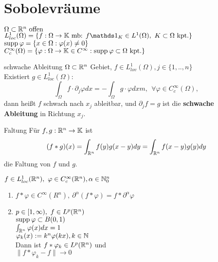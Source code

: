 \section{Sobolevräume}

\(\Omega \subset \mathbb{R}^n \text{ offen}\)\\
\(L_{loc}^1(\Omega) = \{f:\Omega \to \KK \text{ mb: }
f\indicator_K \in L^1(\Omega),\ K\subset \Omega \text{ kpt.}\}\) \\
\(\text{supp\hspace{0.2em}}\varphi = \{x\in \Omega: \varphi(x) \neq 0\}\)\\
\(C_c^\infty(\Omega)=\{\varphi:\Omega \to \mathbb{K} \in C^\infty: 
\text{supp\hspace{0.2em}}\varphi\subset\Omega \text{ kpt.}\}\)\\

\begin{definition}{schwache Ableitung}
    \(\Omega \subset \mathbb{R}^n\) Gebiet,
    \(f\in L^1_{lov}(\Omega), j\in \{1,..,n\}\)\\
    Existiert \(g \in L^1_{loc}(\Omega):\)
    \[
        \int_\Omega f\cdot \partial_j\varphi dx =
         - \int_\Omega g\cdot \varphi dxm, \ \ 
         \forall \varphi\in C_c^{\infty}(\Omega),
    \]
    dann heißt \(f\) schwach nach \(x_j\) ableitbar, und \(\partial_jf=g\) ist
    die \textbf{schwache Ableitung} in Richtung \(x_j\).

\end{definition}

\begin{definition}{Faltung}
    Für \(f,g:\mathbb{R}^n \to \mathbb{K}\) ist
    \[
        (f\ast g )(x) = \int_{\mathbb{R}^n}f(y)g(x-y)dy
        = \int_{\mathbb{R}^n}f(x-y)g(y)dy
    \] 
    die Faltung von \(f\) und \(g\).
\end{definition}

\begin{lemma}
    \(f\in L_{loc}^1(\mathbb{R}^n),\ \varphi\in C_c^{\infty}(\mathbb{R}^n), 
    \alpha \in \mathbb{N}_0^n\)
    \begin{enumerate}[label = (\roman*)]
        \item \(f\ast \varphi \in C^\infty(R^n),\ 
            \partial^\alpha(f\ast \varphi) = f\ast \partial^\alpha\varphi\)
        \item \(p\in [1,\infty),\ f\in L^p(\mathbb{R}^n)\)\\
            \(\text{supp\hspace{0.2em}}\varphi \subset B(0,1)\)\\
            \(\int_{\mathbb{R}^n}\varphi(x)dx = 1\)\\
            \(\varphi_k(x):=k^n\varphi(kx), k\in\mathbb{N}\)\\
            Dann ist \(f\ast \varphi_k \in L^p(\mathbb{R}^n)\) und\\
            \(\|f\ast \varphi_k -f\|\to 0\)
    \end{enumerate}
\end{lemma}


